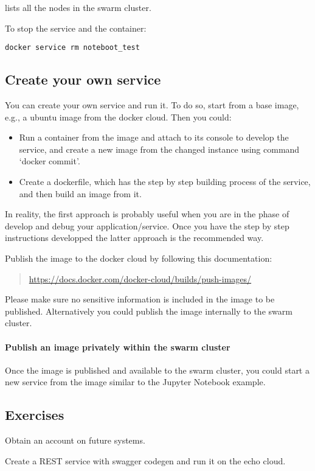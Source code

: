 lists all the nodes in the swarm cluster.

To stop the service and the container:

\begin{lstlisting}
docker service rm noteboot_test
\end{lstlisting}


\subsection{Create your own service}\label{create-your-own-service}

You can create your own service and run it. To do so, start from a base
image, e.g., a ubuntu image from the docker cloud. Then you could:

\begin{itemize}

\item Run a container from the image and attach to its console to develop
the service, and create a new image from the changed instance using
command `docker commit'.

\item Create a dockerfile, which has the step by step building process of
the service, and then build an image from it.

\end{itemize}

In reality, the first approach is probably useful when you are in the
phase of develop and debug your application/service. Once you have the
step by step instructions developped the latter approach is the
recommended way.

Publish the image to the docker cloud by following this documentation:

\begin{quote}
\url{https://docs.docker.com/docker-cloud/builds/push-images/}
\end{quote}

Please make sure no sensitive information is included in the image to
be published. Alternatively you could publish the image internally to
the swarm cluster.

\paragraph{Publish an image privately within the swarm cluster}


Once the image is published and available to the swarm cluster, you
could start a new service from the image similar to the Jupyter Notebook
example.

\subsection{Exercises}

\begin{exercise}

Obtain an account on future systems.

\end{exercise}

\begin{exercise}

Create a REST service with swagger codegen and run it on the echo cloud.

\end{exercise}
